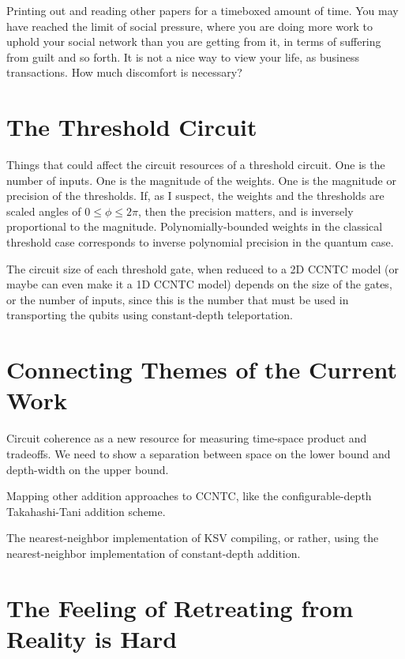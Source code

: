 \documentclass{article}
\begin{document}
Printing out and reading other papers for a timeboxed amount of time.
You may have reached the limit of social pressure, where you are doing
more work to uphold your social network than you are getting from it,
in terms of suffering from guilt and so forth. It is not a nice way
to view your life, as business transactions. How much discomfort
is necessary?

\section{The Threshold Circuit}

Things that could affect the circuit resources of a threshold circuit.
One is the number of inputs. One is the magnitude of the weights.
One is the magnitude or precision of the thresholds. If, as I suspect,
the weights and the thresholds are scaled angles of $0 \le \phi \le 2\pi$,
then the precision matters, and is inversely proportional to the
magnitude. Polynomially-bounded weights in the classical threshold case
corresponds to inverse polynomial precision in the quantum case.

The circuit size of each threshold gate, when reduced to a 2D CCNTC
model (or maybe can even make it a 1D CCNTC model) depends on the
size of the gates, or the number of inputs, since this is the number
that must be used in transporting the qubits using constant-depth
teleportation.

\section{Connecting Themes of the Current Work}

Circuit coherence as a new resource for measuring time-space product and
tradeoffs. We need to show a separation between space on the lower bound
and depth-width on the upper bound.

Mapping other addition approaches to CCNTC, like the configurable-depth
Takahashi-Tani addition scheme.

The nearest-neighbor implementation of KSV compiling, or rather, using
the nearest-neighbor implementation of constant-depth addition.

\section{The Feeling of Retreating from Reality is Hard}
\end{document}
